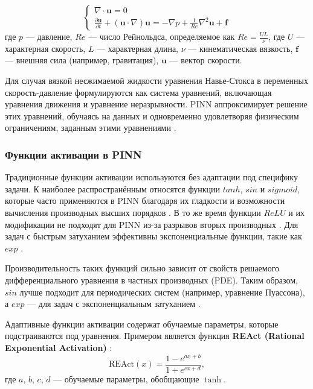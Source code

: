 \begin{equation}
    \begin{cases}
    \nabla \cdot \mathbf{u} = 0 \\
    \frac{\partial \mathbf{u}}{\partial t} + (\mathbf{u} \cdot \nabla) \mathbf{u} = -\nabla p + \frac{1}{Re} \nabla^2 \mathbf{u} + \mathbf{f}
    \end{cases}
    \label{eq:navier_stockes}
\end{equation}
где $p$ — давление, $Re$ — число Рейнольдса, определяемое как $Re = \frac{UL}{\nu}$, где $U$ —
характерная скорость, $L$ — характерная длина, $\nu$ — кинематическая вязкость, $\mathbf{f}$ —
внешняя сила (например, гравитация), $\mathbf{u}$ — вектор скорости.

Для случая вязкой несжимаемой жидкости уравнения Навье-Стокса в переменных скорость-давление формулируются
как система уравнений, включающая уравнения движения и уравнение неразрывности. PINN аппроксимирует
решение этих уравнений, обучаясь на данных и одновременно удовлетворяя физическим ограничениям, заданным
этими уравнениями \cite{jin2021nsfnets}.

\subsubsection{Функции активации в PINN}

Традиционные функции активации используются без адаптации под специфику задачи. К наиболее распространённым
относятся функции $tanh$, $sin$ и $sigmoid$, которые часто применяются в PINN благодаря их гладкости
и возможности вычисления производных высших порядков \cite{0d752c79fb816703274a3d37f85a85689a2a9405}
\cite{Sutfeld2018-io}. В то же время функции $ReLU$ и их модификации не подходят для PINN из-за
разрывов вторых производных \cite{fe520ccac2a6bd50f75a4a34022fe54116871013}. Для задач с быстрым затуханием
эффективны экспоненциальные функции, такие как $exp$ \cite{7fcd4b3c875d8e41eb0c184aa1a42bf4c8906d61}.

Производительность таких функций сильно зависит от свойств решаемого дифференциального уравнения в частных
производных (PDE).  Таким образом, $sin$ лучше подходит для периодических систем (например, уравнение
Пуассона), а $exp$ — для задач с экспоненциальным затуханием \cite{fe520ccac2a6bd50f75a4a34022fe54116871013}.

Адаптивные функции активации содержат обучаемые параметры, которые подстраиваются под уравнения. Примером
является функция \textbf{REAct (Rational Exponential Activation)}
\cite{0d752c79fb816703274a3d37f85a85689a2a9405}:
\begin{equation}
\text{REAct}(x) = \frac{1 - e^{ax + b}}{1 + e^{cx + d}},
\label{eq:react}
\end{equation}
где $a$, $b$, $c$, $d$ — обучаемые параметры, обобщающие $\tanh$. 

